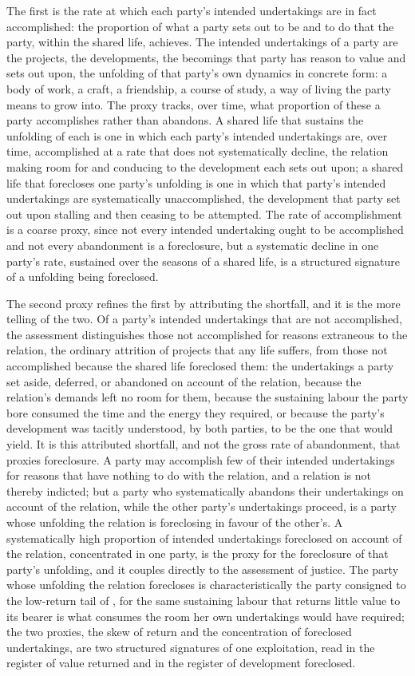 The first is the rate at which each party's intended undertakings are in fact accomplished: the proportion of what a party sets out to be and to do that the party, within the shared life, achieves. The intended undertakings of a party are the projects, the developments, the becomings that party has reason to value and sets out upon, the unfolding of that party's own dynamics in concrete form: a body of work, a craft, a friendship, a course of study, a way of living the party means to grow into. The proxy tracks, over time, what proportion of these a party accomplishes rather than abandons. A shared life that sustains the unfolding of each is one in which each party's intended undertakings are, over time, accomplished at a rate that does not systematically decline, the relation making room for and conducing to the development each sets out upon; a shared life that forecloses one party's unfolding is one in which that party's intended undertakings are systematically unaccomplished, the development that party set out upon stalling and then ceasing to be attempted. The rate of accomplishment is a coarse proxy, since not every intended undertaking ought to be accomplished and not every abandonment is a foreclosure, but a systematic decline in one party's rate, sustained over the seasons of a shared life, is a structured signature of a unfolding being foreclosed.

The second proxy refines the first by attributing the shortfall, and it is the more telling of the two. Of a party's intended undertakings that are not accomplished, the assessment distinguishes those not accomplished for reasons extraneous to the relation, the ordinary attrition of projects that any life suffers, from those not accomplished because the shared life foreclosed them: the undertakings a party set aside, deferred, or abandoned on account of the relation, because the relation's demands left no room for them, because the sustaining labour the party bore consumed the time and the energy they required, or because the party's development was tacitly understood, by both parties, to be the one that would yield. It is this attributed shortfall, and not the gross rate of abandonment, that proxies foreclosure. A party may accomplish few of their intended undertakings for reasons that have nothing to do with the relation, and a relation is not thereby indicted; but a party who systematically abandons their undertakings on account of the relation, while the other party's undertakings proceed, is a party whose unfolding the relation is foreclosing in favour of the other's. A systematically high proportion of intended undertakings foreclosed on account of the relation, concentrated in one party, is the proxy for the foreclosure of that party's unfolding, and it couples directly to the assessment of justice. The party whose unfolding the relation forecloses is characteristically the party consigned to the low-return tail of , for the same sustaining labour that returns little value to its bearer is what consumes the room her own undertakings would have required; the two proxies, the skew of return and the concentration of foreclosed undertakings, are two structured signatures of one exploitation, read in the register of value returned and in the register of development foreclosed.

